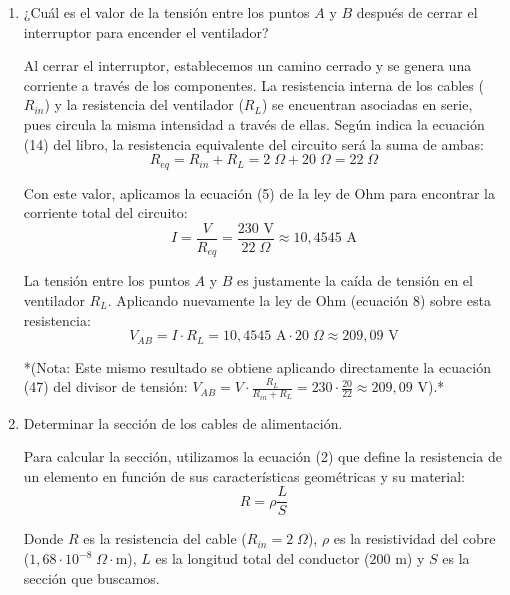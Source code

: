 \documentclass[11pt, a4paper]{article}
\newenvironment{problem}[1][Cuestión]{
		\vspace{0.5cm}
		\noindent{\Large\bfseries #1} \par\vspace{0.5cm}
}{
		\vspace{0.5cm}
}
\begin{document}
\begin{problem}[Cuestión 2]
\begin{enumerate}[label=\alph*)]
{					Por lo tanto, al no haber ninguna pérdida de tensión a lo largo de los cables, la diferencia de potencial entre los puntos $A$ y $B$ es exactamente igual a la tensión que proporciona la fuente principal:
						$$\boxed{V_{AB} = V = 230 \text{ V}}$$
				}

			\item ¿Cuál es el valor de la tensión entre los puntos $A$ y $B$ después de cerrar el interruptor para encender el ventilador?

				{ \color{blue} 
					Al cerrar el interruptor, establecemos un camino cerrado y se genera una corriente a través de los componentes. La resistencia interna de los cables ($R_{in}$) y la resistencia del ventilador ($R_L$) se encuentran asociadas en serie, pues circula la misma intensidad a través de ellas. Según indica la ecuación (14) del libro, la resistencia equivalente del circuito será la suma de ambas:
					$$R_{eq} = R_{in} + R_L = 2 \; \Omega + 20 \; \Omega = 22 \; \Omega$$

					Con este valor, aplicamos la ecuación (5) de la ley de Ohm para encontrar la corriente total del circuito:
					$$I = \frac{V}{R_{eq}} = \frac{230 \text{ V}}{22 \; \Omega} \approx 10,4545 \text{ A}$$

					La tensión entre los puntos $A$ y $B$ es justamente la caída de tensión en el ventilador $R_L$. Aplicando nuevamente la ley de Ohm (ecuación 8) sobre esta resistencia:
					$$\boxed{V_{AB} = I \cdot R_L = 10,4545 \text{ A} \cdot 20 \; \Omega \approx 209,09 \text{ V}}$$

					*(Nota: Este mismo resultado se obtiene aplicando directamente la ecuación (47) del divisor de tensión: $V_{AB} = V \cdot \frac{R_L}{R_{in} + R_L} = 230 \cdot \frac{20}{22} \approx 209,09 \text{ V}$).*
				}

			\vspace{0.5cm}

			\item Determinar la sección de los cables de alimentación.

				{ \color{blue} 
					Para calcular la sección, utilizamos la ecuación (2) que define la resistencia de un elemento en función de sus características geométricas y su material:
					$$R = \rho \frac{L}{S}$$

					Donde $R$ es la resistencia del cable ($R_{in} = 2 \; \Omega$), $\rho$ es la resistividad del cobre ($1,68 \cdot 10^{-8} \; \Omega \cdot \text{m}$), $L$ es la longitud total del conductor ($200 \text{ m}$) y $S$ es la sección que buscamos.

}
\end{enumerate}
\end{problem}
\end{document}
